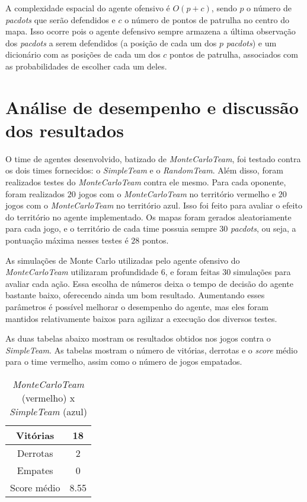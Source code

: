 \documentclass[a4paper,12pt]{article}
\begin{document}
A complexidade espacial do agente ofensivo é $O(p + c)$, sendo $p$ o número de \textit{pacdots}
que serão defendidos e $c$ o número de pontos de patrulha no centro do mapa. Isso ocorre pois o
agente defensivo sempre armazena a última observação dos \textit{pacdots} a serem defendidos
(a posição de cada um dos $p$ \textit{pacdots}) e um dicionário com as posições de cada um dos $c$
pontos de patrulha, associados com as probabilidades de escolher cada um deles.

\section{Análise de desempenho e discussão dos resultados}

O time de agentes desenvolvido, batizado de \textit{MonteCarloTeam}, foi testado contra os dois
times fornecidos: o \textit{SimpleTeam} e o \textit{RandomTeam}. Além disso, foram
realizados testes do \textit{MonteCarloTeam} contra ele mesmo. Para cada oponente, foram realizados
$20$ jogos com o \textit{MonteCarloTeam} no território vermelho e $20$ jogos com o \textit{MonteCarloTeam}
no território azul. Isso foi feito para avaliar o efeito do território no agente implementado.
Os mapas foram gerados aleatoriamente para cada jogo, e o território de cada time
possuia sempre $30$ \textit{pacdots}, ou seja, a pontuação máxima nesses testes é $28$ pontos.

As simulações de Monte Carlo utilizadas pelo agente ofensivo do \textit{MonteCarloTeam} utilizaram
profundidade $6$, e foram feitas $30$ simulações para avaliar cada ação. Essa escolha de números
deixa o tempo de decisão do agente bastante baixo, oferecendo ainda um bom resultado.
Aumentando esses parâmetros é
possível melhorar o desempenho do agente, mas eles foram mantidos relativamente baixos
para agilizar a execução dos diversos testes.

As duas tabelas abaixo mostram os resultados obtidos nos jogos contra o \textit{SimpleTeam}.
As tabelas mostram o número de vitórias, derrotas e o \textit{score} médio para o time vermelho,
assim como o número de jogos empatados.

\begin{table}[htb!]
    {\centering
    \begin{tabular}{|c|c|} \hline
    Vitórias     & 18   \\ \hline
    Derrotas     & 2    \\ \hline
    Empates      & 0    \\ \hline
    Score médio  & 8.55 \\ \hline
    \end{tabular}
    \caption{\textit{MonteCarloTeam} (vermelho) x \textit{SimpleTeam} (azul)}
    }
\end{table}
\end{document}
